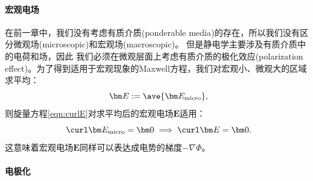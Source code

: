 \paragraph{宏观电场}
在前一章中，我们没有考虑有质介质(ponderable media)的存在，所以我们没有区分微观场(microscopic)和宏观场(macroscopic)。
但是静电学主要涉及有质介质中的电荷和场，因此%
我们必须在微观层面上考虑有质介质的极化效应(polarization effect)。为了得到适用于宏观现象的Maxwell方程，我们对宏观小、微观大的区域求平均：%
\[
    \bm E:=\ave{\bm E_\text{micro}},
\]
则旋量方程\eqref{eqn:curlE}对求平均后的宏观电场$\bm E$适用：
\begin{equation}
    \label{eqn:curlE-macro}
    \curl\bm E_\text{micro}=\bm 0\implies\curl\bm E=\bm 0.
\end{equation}
这意味着宏观电场$\bm E$同样可以表达成电势的梯度$-\nabla\Phi$。

\paragraph{电极化}

\newcommand{\pol}{\mathrm{p}}


